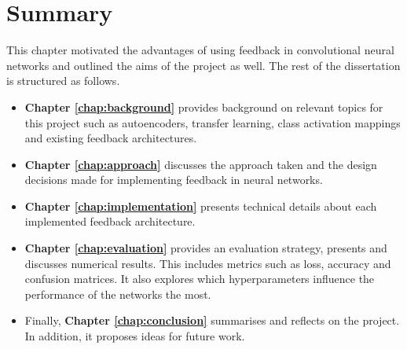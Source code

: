 \documentclass{l4proj}
\begin{document}
\section{Summary}
This chapter motivated the advantages of using feedback in convolutional neural networks and outlined the aims of the project as well.
The rest of the dissertation is structured as follows.
\begin{itemize}
    \item \textbf{Chapter \ref{chap:background}} provides background on relevant topics for this project such as autoencoders, transfer learning, class activation mappings and existing feedback architectures.
    \item \textbf{Chapter \ref{chap:approach}} discusses the approach taken and the design decisions made for implementing feedback in neural networks. \item \textbf{Chapter \ref{chap:implementation}} presents technical details about each implemented feedback architecture.
    \item \textbf{Chapter \ref{chap:evaluation}} provides an evaluation strategy, presents and discusses numerical results. This includes metrics such as loss, accuracy and confusion matrices. It also explores which hyperparameters influence the performance of the networks the most.
    \item Finally, \textbf{Chapter \ref{chap:conclusion}} summarises and reflects on the project. In addition, it proposes ideas for future work.
\end{itemize}
 


\end{document}
